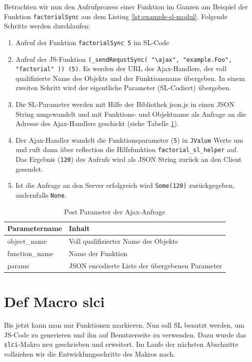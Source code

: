 \documentclass[12pt,bibtotoc]{scrreprt}
\begin{document}
Betrachten wir nun den Aufrufprozess einer Funktion im Ganzen am Beispiel der Funktion \lstinline!factorialSync! aus dem Listing \ref{lst:example-sl-modul}. Folgende Schritte werden durchlaufen:
\begin{enumerate}
 \item{Aufruf der Funktion \lstinline!factorialSync 5! im \ac{SL}-Code}
 \item{Aufruf der \ac{JS}-Funktion \lstinline!(_sendRequstSync( "\ajax", "example.Foo", "factorial" )) (5)!. Es werden der \ac{URL} des Ajax-Handlers, der voll qualifizierte Name des Objekts und der Funktionsname übergeben. In einem zweiten Schritt wird der eigentliche Parameter (\ac{SL}-Codiert) übergeben.}
 \item{Die \ac{SL}-Parameter werden mit Hilfe der Bibliothek json.js \cite{Crockford2010} in einen JSON String umgewandelt und mit Funktions- und Objektname als Anfrage an die Adresse des Ajax-Handlers geschickt (siehe Tabelle \ref{tab:post-parameter}).}
 \item{Der Ajax-Handler wandelt die Funktionsparameter (\lstinline!5!) in \lstinline!JValue! Werte um \cite{Json4s} und ruft dann über reflection die Hilfsfunktion \lstinline!factorial_sl_helper! auf. Das Ergebnis (\lstinline!120!) des Aufrufs wird als JSON String zurück an den Client gesendet.}
 \item{Ist die Anfrage an den Server erfolgreich wird \lstinline!Some(120)! zurückgegeben, andernfalls \lstinline!None!.}
\end{enumerate}

\begin{table}[h]
\caption{Post Parameter der Ajax-Anfrage}
\centering
\begin{tabular}{ll}
Parametername        &   Inhalt \\
\hline
object\_name   & Voll qualifizierter Name des Objekts \\
function\_name & Name der Funktion\\
params         & JSON encodierte Liste der übergebenen Parameter\\
\end{tabular}
\label{tab:post-parameter}
\end{table}

\section{Def Macro slci}
\label{sec:inline-macro}

Bis jetzt kann man nur Funktionen markieren. Nun soll \ac{SL} benutzt werden, um \ac{JS}-Code zu generieren und ihn auf Benutzerseite zu verwenden. Dazu wurde das \lstinline!slci!-Makro neu geschrieben und erweitert. Im Laufe der nächsten Abschnitte vollziehen wir die Entwicklungsschritte des Makros nach.
\end{document}
